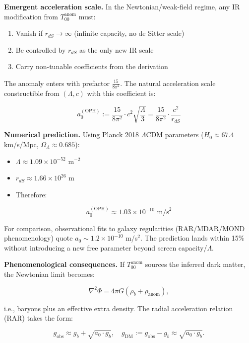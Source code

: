 \documentclass[11pt,a4paper]{article}
\theoremstyle{remark}
\providecommand{\tightlist}{%
  \setlength{\itemsep}{0pt}\setlength{\parskip}{0pt}}
\begin{document}
\textbf{Emergent acceleration scale.} In the Newtonian/weak-field regime, any
IR modification from \(T_{00}^{\mathrm{anom}}\) must:

\begin{enumerate}
\def\labelenumi{\arabic{enumi}.}
\tightlist
\item
  Vanish if \(r_{dS} \to \infty\) (infinite capacity, no de Sitter scale)
\item
  Be controlled by \(r_{dS}\) as the only new IR scale
\item
  Carry non-tunable coefficients from the derivation
\end{enumerate}

The anomaly enters with prefactor \(\frac{15}{8\pi^2}\). The natural acceleration
scale constructible from \((\Lambda, c)\) with this coefficient is:

\[
\boxed{
a_0^{\mathrm{(OPH)}} := \frac{15}{8\pi^2} \cdot c^2 \sqrt{\frac{\Lambda}{3}}
= \frac{15}{8\pi^2} \cdot \frac{c^2}{r_{dS}}
}
\]

\textbf{Numerical prediction.} Using Planck 2018 \(\Lambda\)CDM parameters
(\(H_0 \approx 67.4\) km/s/Mpc, \(\Omega_\Lambda \approx 0.685\)):

\begin{itemize}
\tightlist
\item
  \(\Lambda \approx 1.09 \times 10^{-52}\) m\(^{-2}\)
\item
  \(r_{dS} \approx 1.66 \times 10^{26}\) m
\item
  Therefore:
\end{itemize}

\[
\boxed{
a_0^{\mathrm{(OPH)}} \approx 1.03 \times 10^{-10} \text{ m/s}^2
}
\]

For comparison, observational fits to galaxy regularities (RAR/MDAR/MOND
phenomenology) quote \(a_0 \sim 1.2 \times 10^{-10}\) m/s\(^2\). The prediction
lands within 15\% without introducing a new free parameter beyond screen
capacity/\(\Lambda\).

\textbf{Phenomenological consequences.} If \(T_{00}^{\mathrm{anom}}\) sources the
inferred dark matter, the Newtonian limit becomes:

\[
\nabla^2 \Phi = 4\pi G (\rho_b + \rho_{\mathrm{anom}}),
\]

i.e., baryons plus an effective extra density. The radial acceleration
relation (RAR) takes the form:

\[
g_{\mathrm{obs}} \approx g_b + \sqrt{a_0 \cdot g_b},
\quad
g_{\mathrm{DM}} := g_{\mathrm{obs}} - g_b \approx \sqrt{a_0 \cdot g_b}.
\]
\end{document}
